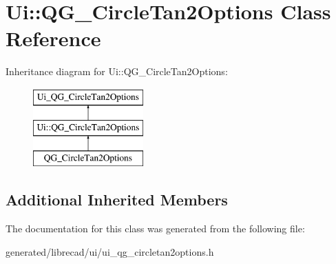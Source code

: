 \hypertarget{classUi_1_1QG__CircleTan2Options}{\section{Ui\-:\-:Q\-G\-\_\-\-Circle\-Tan2\-Options Class Reference}
\label{classUi_1_1QG__CircleTan2Options}
}
Inheritance diagram for Ui\-:\-:Q\-G\-\_\-\-Circle\-Tan2\-Options\-:\begin{figure}[H]
\begin{center}
\leavevmode
\includegraphics[height=3.000000cm]{classUi_1_1QG__CircleTan2Options}
\end{center}
\end{figure}
\subsection*{Additional Inherited Members}


The documentation for this class was generated from the following file\-:\begin{DoxyCompactItemize}
\item 
generated/librecad/ui/ui\-\_\-qg\-\_\-circletan2options.\-h\end{DoxyCompactItemize}
